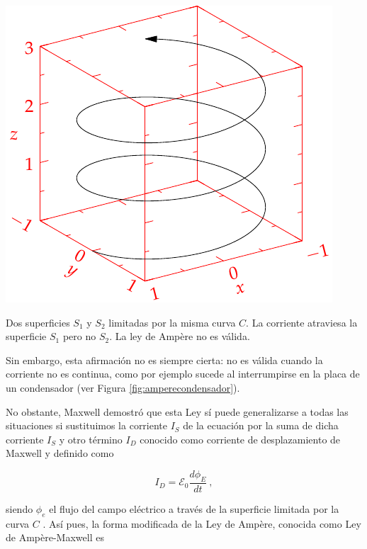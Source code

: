 \documentclass{tufte-handout}
\begin{document}
\begin{marginfigure}%
    \centering
    \includegraphics[width=\linewidth]{helix}
    \caption{Dos superficies $S_1$ y $S_2$ limitadas por la misma curva $C$. La corriente atraviesa la superficie $S_1$ pero no $S_2$. La ley de Ampère no es válida.}
    \label{fig:amperecondensador}
\end{marginfigure}

Sin embargo, esta afirmación no es siempre cierta: no es válida cuando la corriente no es continua, como por ejemplo sucede al interrumpirse en la placa de un condensador (ver Figura \ref{fig:amperecondensador}).

No obstante, Maxwell demostró que esta Ley sí puede generalizarse a todas las situaciones si sustituimos la corriente $I_S$ de la ecuación por la suma de dicha corriente $I_S$ y otro término $I_D$ conocido como corriente de desplazamiento de Maxwell y definido como

\begin{equation}
I_D = \mathcal{E}_0\displaystyle\frac{d\phi_E}{dt}~,
\end{equation}

siendo $\phi_e$ el flujo del campo eléctrico a través de la superficie limitada por la curva $C$ . Así pues, la forma modificada de la Ley de Ampère, conocida como Ley de Ampère-Maxwell es
\end{document}
